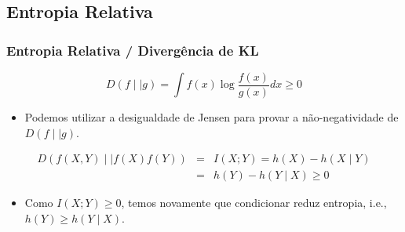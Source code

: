 \subsection{Entropia Relativa}
\begin{frame}[allowframebreaks]
  \frametitle{Entropia Relativa / Divergência de KL}
  \begin{definition}
  \begin{equation}
	D( f \mid \mid g ) = \int f(x) \log \frac{f(x)}{g(x)} dx \geq 0
  \end{equation}
  \end{definition}
  \begin{itemize}
  \item Podemos utilizar a desigualdade de Jensen para provar a não-negatividade de $D(f \mid \mid g)$.
  \end{itemize}

  \begin{definition}
  \begin{eqnarray}
	D( f(X,Y) \mid\mid f(X) f(Y) ) &=& I(X;Y) = h(X) - h(X\mid Y) \\
		&=& h(Y) - h(Y\mid X) \geq 0
  \end{eqnarray}
  \end{definition}
  \begin{itemize}
  \item Como $I(X;Y) \geq 0$, temos novamente que condicionar reduz entropia, i.e., $h(Y) \geq h(Y\mid X)$.
  \end{itemize}

\end{frame}


